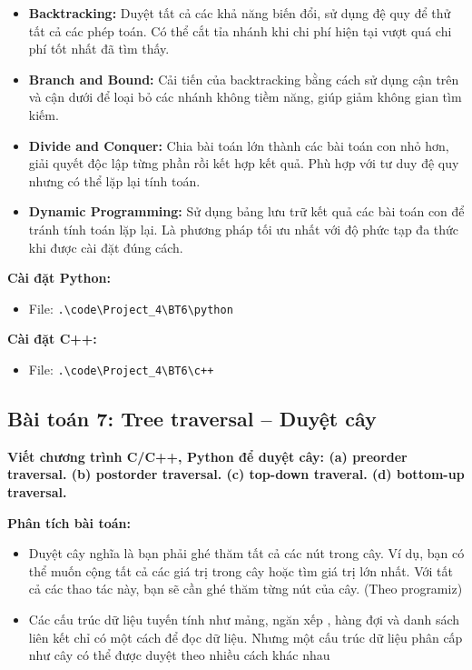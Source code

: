 \documentclass[12pt,a4paper]{article}
\begin{document}
\begin{itemize}[label=\textbullet]
    \item \textbf{Backtracking:} Duyệt tất cả các khả năng biến đổi, sử dụng đệ quy để thử tất cả các phép toán. Có thể cắt tỉa nhánh khi chi phí hiện tại vượt quá chi phí tốt nhất đã tìm thấy.
    \item \textbf{Branch and Bound:} Cải tiến của backtracking bằng cách sử dụng cận trên và cận dưới để loại bỏ các nhánh không tiềm năng, giúp giảm không gian tìm kiếm.
    \item \textbf{Divide and Conquer:} Chia bài toán lớn thành các bài toán con nhỏ hơn, giải quyết độc lập từng phần rồi kết hợp kết quả. Phù hợp với tư duy đệ quy nhưng có thể lặp lại tính toán. 
    \item \textbf{Dynamic Programming:} Sử dụng bảng lưu trữ kết quả các bài toán con để tránh tính toán lặp lại. Là phương pháp tối ưu nhất với độ phức tạp đa thức khi được cài đặt đúng cách. 
\end{itemize}


\textbf{Cài đặt Python:}
\begin{itemize}[label=\textbullet]
    \item File: \texttt{.\textbackslash code\textbackslash Project\_4\textbackslash BT6\textbackslash python}
\end{itemize}

\textbf{Cài đặt C++:}
\begin{itemize}[label=\textbullet]
    \item File: \texttt{.\textbackslash code\textbackslash Project\_4\textbackslash BT6\textbackslash c++}
\end{itemize}

\subsection{Bài toán 7: Tree traversal – Duyệt cây}

\begin{problembox}
    \textbf{Viết chương trình C/C++, Python để duyệt cây: (a) preorder traversal. (b) postorder
traversal. (c) top-down traveral. (d) bottom-up traversal.} 
\end{problembox}

\textbf{Phân tích bài toán:}

\begin{itemize}[label=\textbullet]
    \item Duyệt cây nghĩa là bạn phải ghé thăm tất cả các nút trong cây. Ví dụ, bạn có thể muốn cộng tất cả các giá trị trong cây hoặc tìm giá trị lớn nhất. Với tất cả các thao tác này, bạn sẽ cần ghé thăm từng nút của cây. (Theo programiz)
    \item Các cấu trúc dữ liệu tuyến tính như mảng, ngăn xếp , hàng đợi và danh sách liên kết chỉ có một cách để đọc dữ liệu. Nhưng một cấu trúc dữ liệu phân cấp như cây có thể được duyệt theo nhiều cách khác nhau

\end{itemize}
\end{document}
